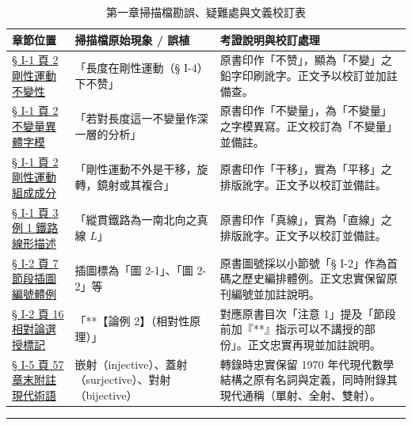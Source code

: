 \documentclass[a4paper,12pt,twoside]{article}
\begin{document}
\begin{table}[H]
\centering
\small
\renewcommand{\arraystretch}{1.35}
\begin{tabularx}{\textwidth}{|p{3.2cm}|p{3.8cm}|X|}
\hline
\textbf{章節位置} & \textbf{掃描檔原始現象 / 誤植} & \textbf{考證說明與校訂處理} \\ \hline

\hyperref[note:b4s-ch1-p2-bubiang]{§ I-1 頁 2 剛性運動不變性} & 
「長度在剛性運動（§ I-4）下不赞」 & 
原書印作「不赞」，顯為「不變」之鉛字印刷訛字。正文予以校訂並加註備查。 \\ \hline

\hyperref[note:b4s-ch1-p2-bubiangliang]{§ I-1 頁 2 不變量異體字模} & 
「若對長度這一不孌量作深一層的分析」 & 
原書印作「不孌量」，為「不變量」之字模異寫。正文校訂為「不變量」並備註。 \\ \hline

\hyperref[note:b4s-ch1-p2-pingyi]{§ I-1 頁 2 剛性運動組成成分} & 
「剛性運動不外是干移，旋轉，鏡射或其複合」 & 
原書印作「干移」，實為「平移」之排版訛字。正文予以校訂並備註。 \\ \hline

\hyperref[note:b4s-ch1-p3-zhixian]{§ I-1 頁 3 例 1 鐵路線形描述} & 
「縱貫鐵路為一南北向之真線 $L$」 & 
原書印作「真線」，實為「直線」之排版訛字。正文予以校訂並備註。 \\ \hline

\hyperref[note:b4s-ch1-p7-fig2-1]{§ I-2 頁 7 節段插圖編號體例} & 
插圖標為「圖 2-1」、「圖 2-2」等 & 
原書圖號採以小節號「§ I-2」作為首碼之歷史編排體例。正文忠實保留原刊編號並加註說明。 \\ \hline

\hyperref[note:b4s-ch1-p16-lorentz]{§ I-2 頁 16 相對論選授標記} & 
「**【論例 2】（相對性原理）」 & 
對應原書目次「注意 1」提及「節段前加『**』指示可以不講授的部份」。正文忠實再現並加註說明。 \\ \hline

\hyperref[note:b4s-ch1-p57-appendix-note]{§ I-5 頁 57 章末附註現代術語} & 
嵌射（injective）、蓋射（surjective）、對射（bijective） & 
轉錄時忠實保留 1970 年代現代數學結構之原有名詞與定義，同時附錄其現代通稱（單射、全射、雙射）。 \\ \hline

\end{tabularx}
\caption{第一章掃描檔勘誤、疑難處與文義校訂表}
\label{tab:errata_b4_ch1}
\end{table}

\vspace{1em}
\hrule
\vspace{1em}

\tableofcontents
\newpage


\end{document}
